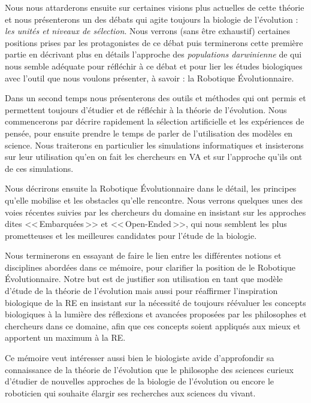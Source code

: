 Nous nous attarderons ensuite sur certaines visions plus actuelles de cette théorie et nous présenterons un des débats qui agite toujours la biologie de l'évolution : \emph{les unités et niveaux de sélection}. Nous verrons (sans être exhaustif) certaines positions prises par les protagonistes de ce débat puis terminerons cette première partie en décrivant plus en détails l'approche des \emph{populations darwinienne} de \cite{godfrey2009darwinian} qui nous semble adéquate pour réfléchir à ce débat et pour lier les études biologiques avec l'outil que nous voulons présenter, à savoir : la Robotique \'Evolutionnaire.

Dans un second temps nous présenterons des outils et méthodes qui ont permis et permettent toujours d'étudier et de réfléchir à la théorie de l'évolution. Nous commencerons par décrire rapidement la sélection artificielle et les expériences de pensée, pour ensuite prendre le temps de parler de l'utilisation des modèles en science. Nous traiterons en particulier les simulations informatiques et insisterons sur leur utilisation qu'en on fait les chercheurs en VA et sur l'approche qu'ils ont de ces simulations. 

Nous décrirons ensuite la Robotique \'Evolutionnaire dans le détail, les principes qu'elle mobilise et les obstacles qu'elle rencontre. Nous verrons quelques unes des voies récentes suivies par les chercheurs du domaine en insistant sur les approches dites <<\,Embarquées\,>> et <<\,Open-Ended\,>>, qui nous semblent les plus prometteuses et les meilleures candidates pour l'étude de la biologie.

Nous terminerons en essayant de faire le lien entre les différentes notions et disciplines abordées dans ce mémoire, pour clarifier la position de le Robotique \'Evolutionnaire. Notre but est de justifier son utilisation en tant que modèle d'étude de la théorie de l'évolution mais aussi pour réaffirmer l'inspiration biologique de la RE en insistant sur la nécessité de toujours réévaluer les concepts biologiques à la lumière des réflexions et avancées proposées par les philosophes et chercheurs dans ce domaine, afin que ces concepts soient appliqués aux mieux et apportent un maximum à la RE.

Ce mémoire veut intéresser aussi bien le biologiste avide d'approfondir sa connaissance de la théorie de l'évolution que le philosophe des sciences curieux d'étudier de nouvelles approches de la biologie de l'évolution ou encore le roboticien qui souhaite élargir ses recherches aux sciences du vivant.
